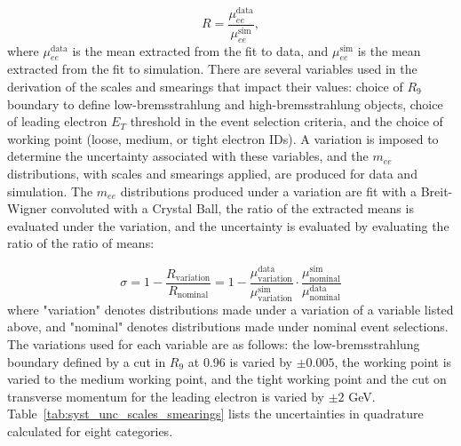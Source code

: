 \begin{equation}
    R = \frac{\mu_{ee}^{\mathrm{data}}}{\mu_{ee}^{\mathrm{sim}}},
\end{equation}
where $\mu_{ee}^{\mathrm{data}}$ is the mean extracted from the fit to data, and $\mu_{ee}^{\mathrm{sim}}$ is the mean extracted from the fit to simulation. There are several variables used in the derivation of the scales and smearings that impact their values: choice of $R_9$ boundary to define low-bremsstrahlung and high-bremsstrahlung objects, choice of leading electron $E_T$ threshold in the event selection criteria, and the choice of working point (loose, medium, or tight electron IDs). A variation is imposed to determine the uncertainty associated with these variables, and the $m_{ee}$ distributions, with scales and smearings applied, are produced for data and simulation. The $m_{ee}$ distributions produced under a variation are fit with a Breit-Wigner convoluted with a Crystal Ball, the ratio of the extracted means is evaluated under the variation, and the uncertainty is evaluated by evaluating the ratio of the ratio of means:


\begin{equation}
    \sigma = 1 - \frac{R_{\mathrm{variation}}}{R_{\mathrm{nominal}}} = 1 - \frac{\mu_{\mathrm{variation}}^{\mathrm{data}}}{\mu_{\mathrm{variation}}^{\mathrm{sim}}} \cdot \frac{\mu_{\mathrm{nominal}}^{\mathrm{sim}}}{\mu_{\mathrm{nominal}}^{\mathrm{data}}}
\end{equation}
where "variation" denotes distributions made under a variation of a variable listed above, and "nominal" denotes distributions made under nominal event selections. The variations used for each variable are as follows: the low-bremsstrahlung boundary defined by a cut in $R_9$ at 0.96 is varied by $\pm 0.005$, the working point is varied to the medium working point, and the tight working point and the cut on transverse momentum for the leading electron is varied by $\pm 2$ GeV. Table~\ref{tab:syst_unc_scales_smearings} lists the uncertainties in quadrature calculated for eight categories.

